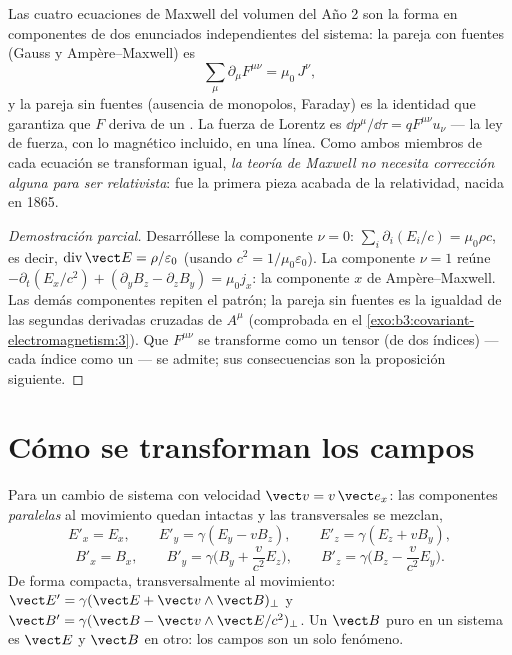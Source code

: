 \begin{theorem}\label{thm:b3:covariant-electromagnetism:maxwell}
Las cuatro ecuaciones de Maxwell del volumen del Año 2 son la forma en
componentes de dos enunciados independientes del sistema: la pareja con
fuentes (Gauss y Ampère--Maxwell) es
\[
\sum_\mu \partial_\mu F^{\mu\nu} = \mu_0\,J^\nu ,
\]
y la pareja sin fuentes (ausencia de monopolos, Faraday) es la identidad que
garantiza que $F$ deriva de un . La fuerza de Lorentz es
$\dd p^\mu/\dd\tau = qF^{\mu\nu}u_\nu$ --- la ley de fuerza, con lo
magnético incluido, en una línea. Como ambos miembros de cada ecuación se
transforman igual, \emph{la teoría de Maxwell no necesita corrección alguna
para ser relativista}: fue la primera pieza acabada de la relatividad,
nacida en 1865.
\end{theorem}

\begin{proof}[Demostración parcial]
Desarróllese la componente $\nu = 0$: $\sum_i\partial_i(E_i/c) =
\mu_0\rho c$, es decir, $\operatorname{div}\vect E = \rho/\varepsilon_0$
(usando $c^2 = 1/\mu_0\varepsilon_0$). La componente $\nu = 1$
reúne $-\partial_t(E_x/c^2) + (\partial_yB_z - \partial_zB_y)
= \mu_0 j_x$: la componente $x$ de Ampère--Maxwell. Las demás
componentes repiten el patrón; la pareja sin fuentes es la igualdad de las
segundas derivadas cruzadas de $A^\mu$ (comprobada en el
\cref{exo:b3:covariant-electromagnetism:3}). Que $F^{\mu\nu}$
se transforme como un tensor (de dos índices) --- cada índice como un
 --- se admite; sus consecuencias son la proposición siguiente.
\end{proof}

\section{Cómo se transforman los campos}

\begin{proposition}\label{prop:b3:covariant-electromagnetism:transform}
Para un cambio de sistema con velocidad $\vect v = v\,\vect e_x$: las
componentes \emph{paralelas} al movimiento quedan intactas y las
transversales se mezclan,
\[
E'_x = E_x , \qquad
E'_y = \gamma(E_y - vB_z) , \qquad
E'_z = \gamma(E_z + vB_y) ,
\]
\[
B'_x = B_x , \qquad
B'_y = \gamma\Big(B_y + \frac{v}{c^2}E_z\Big) , \qquad
B'_z = \gamma\Big(B_z - \frac{v}{c^2}E_y\Big) .
\]
De forma compacta, transversalmente al movimiento: $\vect E' = \gamma(\vect E +
\vect v\wedge\vect B)_\perp$ y $\vect B' = \gamma(\vect B - \vect
v\wedge\vect E/c^2)_\perp$. Un $\vect B$ puro en un sistema es $\vect
E$ y $\vect B$ en otro: los campos son un solo fenómeno.
\end{proposition}
\admitted

